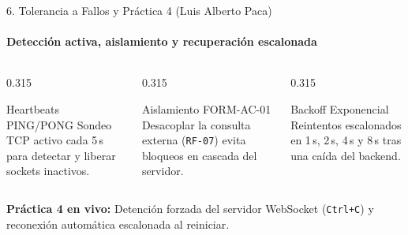 \documentclass[aspectratio=169,10pt]{beamer}
\begin{document}
\begin{frame}{6. Tolerancia a Fallos y Práctica 4 (Luis Alberto Paca)}
  \framesubtitle{Detección activa, aislamiento y recuperación escalonada \cite{mitrovic2023websocket,ref4}}
  \vspace{0.15cm}
  \begin{columns}[T,totalwidth=\textwidth]
    \begin{column}{0.315\textwidth}
      \begin{bluecard}{Heartbeats PING/PONG}
        \footnotesize Sondeo TCP activo cada 5\,s para detectar y liberar sockets inactivos.
      \end{bluecard}
    \end{column}
    \begin{column}{0.315\textwidth}
      \begin{bluecard}{Aislamiento FORM-AC-01}
        \footnotesize Desacoplar la consulta externa (\texttt{RF-07}) evita bloqueos en cascada del servidor.
      \end{bluecard}
    \end{column}
    \begin{column}{0.315\textwidth}
      \begin{ambercard}{Backoff Exponencial}
        \footnotesize Reintentos escalonados en 1\,s, 2\,s, 4\,s y 8\,s tras una caída del backend.
      \end{ambercard}
    \end{column}
  \end{columns}
  \vspace{0.45cm}
  \begin{demobar}
    \textcolor{AmberAccent}{\textbf{Práctica 4 en vivo:}} Detención forzada del servidor WebSocket (\texttt{Ctrl+C}) y reconexión automática escalonada al reiniciar.
  \end{demobar}
\end{frame}
\end{document}
